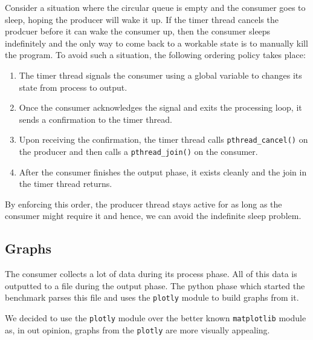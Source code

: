 \documentclass[10pt, author, twocolumn]{article}
\begin{document}
Consider a situation where the circular queue is empty and the consumer goes to sleep, hoping the producer will wake it up. If the timer thread cancels the prodcuer before it can wake the consumer up, then the consumer sleeps indefinitely and the only way to come back to a workable state is to manually kill the program. To avoid such a situation, the following ordering policy takes place:

\begin{enumerate}
    \item The timer thread signals the consumer using a global variable to changes its state from process to output. 
    \item Once the consumer acknowledges the signal and exits the processing loop, it sends a confirmation to the timer thread. 
    \item Upon receiving the confirmation, the timer thread calls \texttt{pthread\_cancel()} on the producer and then calls a \texttt{pthread\_join()} on the consumer.
    \item After the consumer finishes the output phase, it exists cleanly and the join in the timer thread returns. 
\end{enumerate}

By enforcing this order, the producer thread stays active for as long as the consumer might require it and hence, we can avoid the indefinite sleep problem. 

\subsection{Graphs}
The consumer collects a lot of data during its process phase. All of this data is outputted to a file during the output phase. The python phase which started the benchmark parses this file and uses the \texttt{plotly} module to build graphs from it.

We decided to use the \texttt{plotly} module over the better known \texttt{matplotlib} module as, in out opinion, graphs from the \texttt{plotly} are more visually appealing. 
	 
\end{document}

